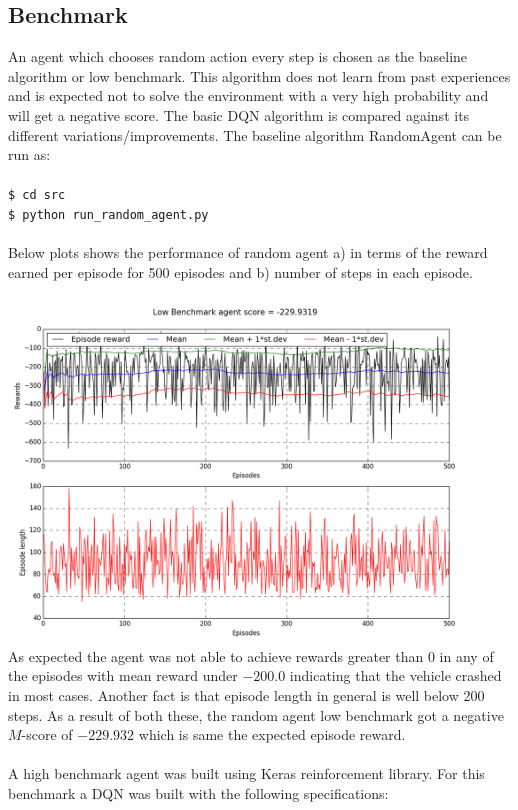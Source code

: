 \documentclass{article}
\begin{document}
\subsection*{Benchmark}
An agent which chooses random action every step is chosen as the baseline algorithm or low benchmark. This algorithm does not learn from past experiences and is expected not to solve the environment with a very high probability and will get a negative score. The basic DQN algorithm is compared against its different variations/improvements.
The baseline algorithm RandomAgent can be run as:\\
\texttt{\\\$ cd src}
\texttt{\\\$ python run\_random\_agent.py}\\\\
Below plots shows the performance of random agent a) in terms of the reward earned per episode for 500 episodes and b) number of steps in each episode.\\\\
\includegraphics[width=12cm,trim={0 0 0 0},clip]{img/randomagent}\\
As expected the agent was not able to achieve rewards greater than $0$ in any of the episodes with mean reward under $-200.0$ indicating that the vehicle crashed in most cases. Another fact is that episode length in general is well below 200 steps. As a result of both these, the random agent low benchmark got a negative $M$-score of $-229.932$ which is same the expected episode reward.\\\\
A high benchmark agent was built using Keras reinforcement library\cite{kerasrl}. For this benchmark a DQN was built with the following specifications:
\end{document}
